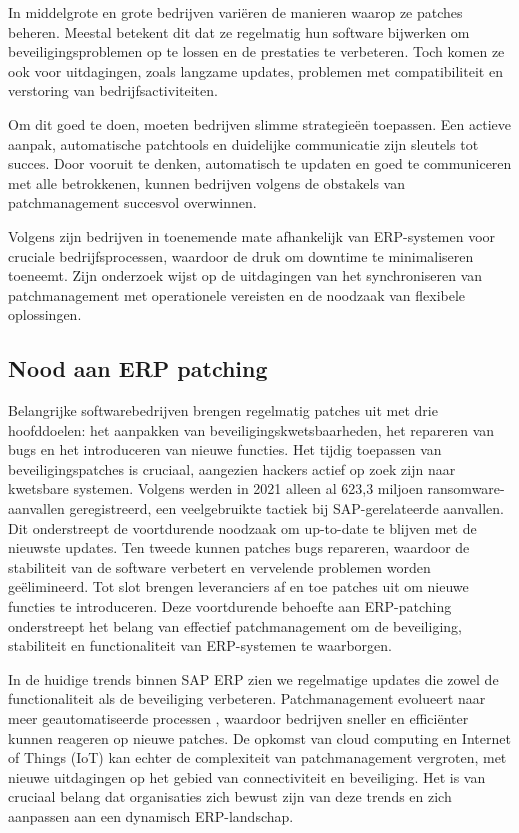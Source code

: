 In middelgrote en grote bedrijven variëren de manieren waarop ze patches beheren. Meestal betekent dit dat ze regelmatig hun software bijwerken om beveiligingsproblemen op te lossen en de prestaties te verbeteren. Toch komen ze ook voor uitdagingen, zoals langzame updates, problemen met compatibiliteit en verstoring van bedrijfsactiviteiten.

Om dit goed te doen, moeten bedrijven slimme strategieën toepassen. Een actieve aanpak, automatische patchtools en duidelijke communicatie zijn sleutels tot succes. Door vooruit te denken, automatisch te updaten en goed te communiceren met alle betrokkenen, kunnen bedrijven volgens \autocite{Josh2022} de obstakels van patchmanagement succesvol overwinnen. 

Volgens \autocite{Hykes2019} zijn bedrijven in toenemende mate afhankelijk van ERP-systemen voor cruciale bedrijfsprocessen, waardoor de druk om downtime te minimaliseren toeneemt. Zijn onderzoek wijst op de uitdagingen van het synchroniseren van patchmanagement met operationele vereisten en de noodzaak van flexibele oplossingen.

\subsection{Nood aan ERP patching }
Belangrijke softwarebedrijven brengen regelmatig patches uit met drie hoofddoelen: het aanpakken van beveiligingskwetsbaarheden, het repareren van bugs en het introduceren van nieuwe functies. Het tijdig toepassen van beveiligingspatches is cruciaal, aangezien hackers actief op zoek zijn naar kwetsbare systemen. Volgens \autocite{Griffiths2022} werden in 2021 alleen al 623,3 miljoen ransomware-aanvallen geregistreerd, een veelgebruikte tactiek bij SAP-gerelateerde aanvallen. Dit onderstreept de voortdurende noodzaak om up-to-date te blijven met de nieuwste updates. Ten tweede kunnen patches bugs repareren, waardoor de stabiliteit van de software verbetert en vervelende problemen worden geëlimineerd. Tot slot brengen leveranciers af en toe patches uit om nieuwe functies te introduceren. Deze voortdurende behoefte aan ERP-patching onderstreept het belang van effectief patchmanagement om de beveiliging, stabiliteit en functionaliteit van ERP-systemen te waarborgen.

In de huidige trends binnen SAP ERP zien we regelmatige updates die zowel de functionaliteit als de beveiliging verbeteren. Patchmanagement evolueert naar meer geautomatiseerde processen \autocite{Mukkamala2022}, waardoor bedrijven sneller en efficiënter kunnen reageren op nieuwe patches. De opkomst van cloud computing en Internet of Things (IoT) kan echter de complexiteit van patchmanagement vergroten, met nieuwe uitdagingen op het gebied van connectiviteit en beveiliging. Het is van cruciaal belang dat organisaties zich bewust zijn van deze trends en zich aanpassen aan een dynamisch ERP-landschap. 

